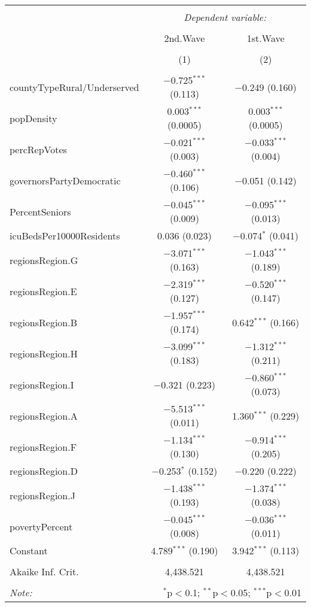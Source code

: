 
\begin{table}[!htbp] \centering 
  \caption{} 
  \label{} 
\begin{tabular}{@{\extracolsep{5pt}}lcc} 
\\[-1.8ex]\hline 
\hline \\[-1.8ex] 
 & \multicolumn{2}{c}{\textit{Dependent variable:}} \\ 
\cline{2-3} 
\\[-1.8ex] & 2nd.Wave & 1st.Wave \\ 
\\[-1.8ex] & (1) & (2)\\ 
\hline \\[-1.8ex] 
 countyTypeRural/Underserved & $-$0.725$^{***}$ (0.113) & $-$0.249 (0.160) \\ 
  popDensity & 0.003$^{***}$ (0.0005) & 0.003$^{***}$ (0.0005) \\ 
  percRepVotes & $-$0.021$^{***}$ (0.003) & $-$0.033$^{***}$ (0.004) \\ 
  governorsPartyDemocratic & $-$0.460$^{***}$ (0.106) & $-$0.051 (0.142) \\ 
  PercentSeniors & $-$0.045$^{***}$ (0.009) & $-$0.095$^{***}$ (0.013) \\ 
  icuBedsPer10000Residents & 0.036 (0.023) & $-$0.074$^{*}$ (0.041) \\ 
  regionsRegion.G & $-$3.071$^{***}$ (0.163) & $-$1.043$^{***}$ (0.189) \\ 
  regionsRegion.E & $-$2.319$^{***}$ (0.127) & $-$0.520$^{***}$ (0.147) \\ 
  regionsRegion.B & $-$1.957$^{***}$ (0.174) & 0.642$^{***}$ (0.166) \\ 
  regionsRegion.H & $-$3.099$^{***}$ (0.183) & $-$1.312$^{***}$ (0.211) \\ 
  regionsRegion.I & $-$0.321 (0.223) & $-$0.860$^{***}$ (0.073) \\ 
  regionsRegion.A & $-$5.513$^{***}$ (0.011) & 1.360$^{***}$ (0.229) \\ 
  regionsRegion.F & $-$1.134$^{***}$ (0.130) & $-$0.914$^{***}$ (0.205) \\ 
  regionsRegion.D & $-$0.253$^{*}$ (0.152) & $-$0.220 (0.222) \\ 
  regionsRegion.J & $-$1.438$^{***}$ (0.193) & $-$1.374$^{***}$ (0.038) \\ 
  povertyPercent & $-$0.045$^{***}$ (0.008) & $-$0.036$^{***}$ (0.011) \\ 
  Constant & 4.789$^{***}$ (0.190) & 3.942$^{***}$ (0.113) \\ 
 \hline \\[-1.8ex] 
Akaike Inf. Crit. & 4,438.521 & 4,438.521 \\ 
\hline 
\hline \\[-1.8ex] 
\textit{Note:}  & \multicolumn{2}{r}{$^{*}$p$<$0.1; $^{**}$p$<$0.05; $^{***}$p$<$0.01} \\ 
\end{tabular} 
\end{table} 
